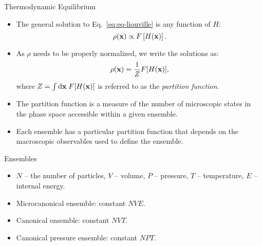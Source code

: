 \documentclass[10pt]{beamer}
\begin{document}
\begin{frame}{Thermodynamic Equilibrium}
\begin{itemize}
\setlength\itemsep{1em}
  \item The general solution to Eq.~\ref{eq:eq-liouville} is any function of $H$:
  \begin{equation}
    \label{eq:gen_sol}
    \rho({\bf x}) \propto F\left[H({\bf x})\right].
  \end{equation}

  \item As $\rho$ needs to be properly normalized, we write the solutions as:
  \begin{equation}
    \rho({\bf x}) = \frac{1}{Z} F[H({\bf x})],
  \end{equation}
  where $Z = \int\mathrm{d}{\bf x}\; F[H({\bf x})]$ is referred to as the \textit{partition function}.

  \item The partition function is a measure of the number of microscopic states in the phase space accessible within a given ensemble.

  \item Each ensemble has a particular partition function that depends on the macroscopic observables used to define the ensemble.
\end{itemize}
\end{frame}

\begin{frame}{Ensembles}
\begin{itemize}
\setlength\itemsep{1em}
  \item $N$ -- the number of particles, $V$ -- volume, $P$ -- pressure, $T$ -- temperature, $E$ -- internal energy.

  \item Microcanonical ensemble: constant $NVE$.

  \item Canonical ensemble: constant $NVT$.

  \item Canonical pressure ensemble: constant $NPT$.
\end{itemize}
\end{frame}
\end{document}

